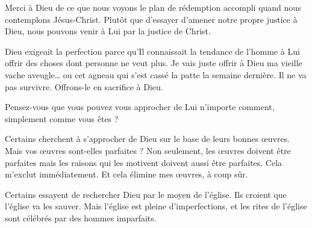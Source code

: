 
Merci à Dieu de ce que nous voyons le plan de rédemption accompli
 quand nous contemplons Jésus-Christ.
 Plutôt que d'essayer d'amener notre propre justice à Dieu,
 nous pouvons venir à Lui par la justice de Christ. 

\dvrule






 Dieu exigeait la perfection parce qu'Il connaissait la tendance
 de l'homme à Lui offrir des choses dont personne ne veut plus.
 \og Je vais juste offrir à Dieu ma vieille vache aveugle\dots{}
 ou cet agneau qui s'est cassé la patte la semaine dernière.
 Il ne va pas survivre. Offrons-le en sacrifice à Dieu. \fg{}


Pensez-vous que vous pouvez vous approcher de Lui n'importe comment,
 simplement comme vous êtes ? 

Certains cherchent à s'approcher de Dieu sur le base de leurs bonnes œuvres.
 Mais vos œuvres sont-elles parfaites ?
 Non seulement, les œuvres doivent être parfaites mais les raisons
 qui les motivent doivent aussi être parfaites. Cela m'exclut immédiatement.
 Et cela élimine mes œuvres, à coup sûr. 

Certains essayent de rechercher Dieu par le moyen de l'église. 
 Ils croient que l'église 
 va les sauver. Mais l'église est pleine d'imperfections,
 et les rites de l'église sont célébrés par des hommes imparfaits. 


